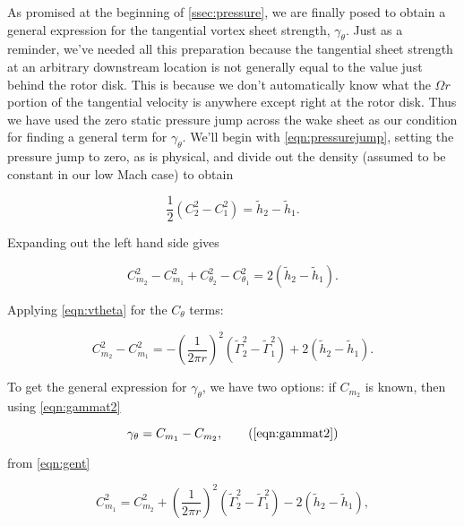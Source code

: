 As promised at the beginning of \cref{ssec:pressure}, we are finally posed to obtain a general expression for the tangential vortex sheet strength, \(\gamma_\theta\).
%
Just as a reminder, we've needed all this preparation because the tangential sheet strength at an arbitrary downstream location is not generally equal to the value just behind the rotor disk.
%
This is because we don't automatically know what the \(\Omega r\) portion of the tangential velocity is anywhere except right at the rotor disk.
%
Thus we have used the zero static pressure jump across the wake sheet as our condition for finding a general term for \(\gamma_\theta\).
%
We'll begin with \cref{eqn:pressurejump}, setting the pressure jump to zero, as is physical, and divide out the density (assumed to be constant in our low Mach case) to obtain

\begin{equation}
    \frac{1}{2} \left(C_2^2 - C_1^2 \right) = \widetilde{h}_2 - \widetilde{h}_1.
\end{equation}

\noindent Expanding out the left hand side gives

\begin{equation}
    C_{m_2}^2 - C_{m_1}^2 + C_{\theta_2}^2 - C_{\theta_1}^2 = 2 \left( \widetilde{h}_2 - \widetilde{h}_1 \right).
\end{equation}

\noindent Applying \cref{eqn:vtheta} for the \(C_\theta\) terms:

\begin{equation}
    \label{eqn:gent}
    C_{m_2}^2 - C_{m_1}^2 = -\left(\frac{1}{2 \pi r}\right)^2 \left(\widetilde{\Gamma}_2^2-\widetilde{\Gamma}_1^2\right) + 2 \left( \widetilde{h}_2 - \widetilde{h}_1 \right).
\end{equation}

To get the general expression for \(\gamma_\theta\), we have two options: if \(C_{m_2}\) is known, then using \cref{eqn:gammat2}

\begin{equation}
    \gamma_\theta = C_{m_1} - C_{m_2},
     \tag{\ref{eqn:gammat2}}
\end{equation}

\where from \cref{eqn:gent}

\begin{equation}
\label{eqn:vm1}
    C_{m_1}^2 = C_{m_2}^2 + \left(\frac{1}{2 \pi r}\right)^2 \left(\widetilde{\Gamma}_2^2-\widetilde{\Gamma}_1^2\right) - 2 \left( \widetilde{h}_2 - \widetilde{h}_1 \right),
\end{equation}

